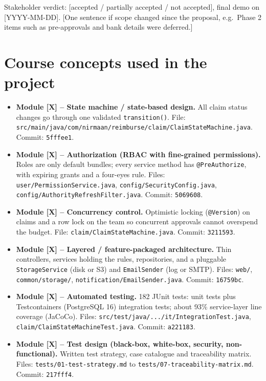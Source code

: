 \documentclass[11pt,a4paper]{article}
\begin{document}
Stakeholder verdict: [accepted / partially accepted / not accepted], final demo on [YYYY-MM-DD]. [One sentence if scope changed since the proposal, e.g.\ Phase 2 items such as pre-approvals and bank details were deferred.]

\section{Course concepts used in the project}

\begin{itemize}[leftmargin=*,nosep]
    \item \textbf{Module [X] -- State machine / state-based design.}
    All claim status changes go through one validated \texttt{transition()}.
    File: \texttt{src/main/java/com/nirmaan/reimburse/claim/ClaimStateMachine.java}.
    Commit: \texttt{5fffee1}.

    \item \textbf{Module [X] -- Authorization (RBAC with fine-grained permissions).}
    Roles are only default bundles; every service method has \texttt{@PreAuthorize}, with expiring grants and a four-eyes rule.
    Files: \texttt{user/PermissionService.java}, \texttt{config/SecurityConfig.java}, \texttt{config/AuthorityRefreshFilter.java}.
    Commit: \texttt{5069608}.

    \item \textbf{Module [X] -- Concurrency control.}
    Optimistic locking (\texttt{@Version}) on claims and a row lock on the team so concurrent approvals cannot overspend the budget.
    File: \texttt{claim/ClaimStateMachine.java}.
    Commit: \texttt{3211593}.

    \item \textbf{Module [X] -- Layered / feature-packaged architecture.}
    Thin controllers, services holding the rules, repositories, and a pluggable \texttt{StorageService} (disk or S3) and \texttt{EmailSender} (log or SMTP).
    Files: \texttt{web/}, \texttt{common/storage/}, \texttt{notification/EmailSender.java}.
    Commit: \texttt{16759bc}.

    \item \textbf{Module [X] -- Automated testing.}
    182 JUnit tests: unit tests plus Testcontainers (PostgreSQL 16) integration tests; about 93\% service-layer line coverage (JaCoCo).
    Files: \texttt{src/test/java/.../it/IntegrationTest.java}, \texttt{claim/ClaimStateMachineTest.java}.
    Commit: \texttt{a221183}.

    \item \textbf{Module [X] -- Test design (black-box, white-box, security, non-functional).}
    Written test strategy, case catalogue and traceability matrix.
    Files: \texttt{tests/01-test-strategy.md} to \texttt{tests/07-traceability-matrix.md}.
    Commit: \texttt{217fff4}.


\end{itemize}
\end{document}

